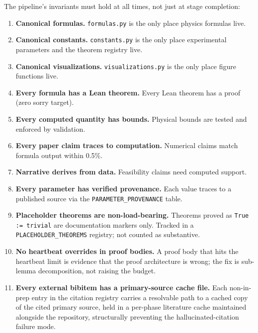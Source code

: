 \documentclass[11pt]{article}
\begin{document}
The pipeline's invariants must hold at all times, not just at stage
completion:

\begin{enumerate}
\item \textbf{Canonical formulas.} \texttt{formulas.py} is the only
place physics formulas live.

\item \textbf{Canonical constants.} \texttt{constants.py} is the only
place experimental parameters and the theorem registry live.

\item \textbf{Canonical visualizations.} \texttt{visualizations.py}
is the only place figure functions live.

\item \textbf{Every formula has a Lean theorem.} Every Lean theorem
has a proof (zero sorry target).

\item \textbf{Every computed quantity has bounds.} Physical bounds
are tested and enforced by validation.

\item \textbf{Every paper claim traces to computation.} Numerical
claims match formula output within 0.5\%.

\item \textbf{Narrative derives from data.} Feasibility claims need
computed support.

\item \textbf{Every parameter has verified provenance.} Each value
traces to a published source via the
\texttt{PARAMETER\_PROVENANCE} table.

\item \textbf{Placeholder theorems are non-load-bearing.} Theorems
proved as \texttt{True := trivial} are documentation markers
only. Tracked in a \texttt{PLACEHOLDER\_THEOREMS} registry; not
counted as substantive.

\item \textbf{No heartbeat overrides in proof bodies.} A proof body
that hits the heartbeat limit is evidence that the proof
architecture is wrong; the fix is sub-lemma decomposition, not
raising the budget.

\item \textbf{Every external bibitem has a primary-source cache
file.} Each non-in-prep entry in the citation registry carries a
resolvable path to a cached copy of the cited primary source,
held in a per-phase literature cache maintained alongside the
repository, structurally preventing the hallucinated-citation
failure mode.


\end{enumerate}
\end{document}
